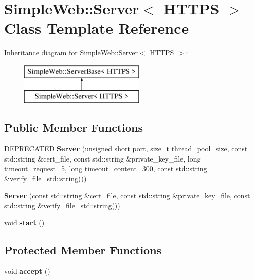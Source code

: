 \hypertarget{a01597}{}\section{Simple\+Web\+:\+:Server$<$ H\+T\+T\+PS $>$ Class Template Reference}
\label{a01597}
Inheritance diagram for Simple\+Web\+:\+:Server$<$ H\+T\+T\+PS $>$\+:\begin{figure}[H]
\begin{center}
\leavevmode
\includegraphics[height=2.000000cm]{a01597}
\end{center}
\end{figure}
\subsection*{Public Member Functions}
\begin{DoxyCompactItemize}
\item 
\mbox{\label{a01597_a1a5530e96cd973de3dc987034ca61b54}} 
D\+E\+P\+R\+E\+C\+A\+T\+ED {\bfseries Server} (unsigned short port, size\+\_\+t thread\+\_\+pool\+\_\+size, const std\+::string \&cert\+\_\+file, const std\+::string \&private\+\_\+key\+\_\+file, long timeout\+\_\+request=5, long timeout\+\_\+content=300, const std\+::string \&verify\+\_\+file=std\+::string())
\item 
\mbox{\label{a01597_a15bb179287dfaa18da16b8877174e8d6}} 
{\bfseries Server} (const std\+::string \&cert\+\_\+file, const std\+::string \&private\+\_\+key\+\_\+file, const std\+::string \&verify\+\_\+file=std\+::string())
\item 
\mbox{\label{a01597_a6a740b3fdbbbf178f540e27942cc93fc}} 
void {\bfseries start} ()
\end{DoxyCompactItemize}
\subsection*{Protected Member Functions}
\begin{DoxyCompactItemize}
\item 
\mbox{\label{a01597_af722d2884eafafada7073feb7793c422}} 
void {\bfseries accept} ()
\end{DoxyCompactItemize}
